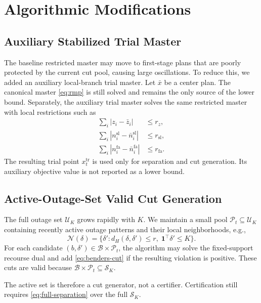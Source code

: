 \documentclass[11pt]{article}
\newcommand{\Bset}{\mathcal B}
\newcommand{\Sset}{\mathcal S}
\newcommand{\Uset}{\mathcal U}
\begin{document}
\section{Algorithmic Modifications}

\subsection{Auxiliary Stabilized Trial Master}

The baseline restricted master may move to first-stage plans that are poorly
protected by the current cut pool, causing large oscillations.  To reduce this,
we added an auxiliary local-branch trial master.  Let $\bar x$ be a center plan.
The canonical master \eqref{eq:rmp} is still solved and remains the only source
of the lower bound.  Separately, the auxiliary trial master solves the same
restricted master with local restrictions such as
\begin{align}
    \sum_i |z_i-\bar z_i| &\le r_z, \label{eq:z-trust}\\
    \sum_i |n^{\mathrm{sl}}_i-\bar n^{\mathrm{sl}}_i| &\le r_{\mathrm{sl}},
    \label{eq:sl-trust}\\
    \sum_i |n^{\mathrm{fa}}_i-\bar n^{\mathrm{fa}}_i| &\le r_{\mathrm{fa}}.
    \label{eq:fa-trust}
\end{align}
The resulting trial point $x_t^{\mathrm{tr}}$ is used only for separation and
cut generation.  Its auxiliary objective value is not reported as a lower
bound.

\subsection{Active-Outage-Set Valid Cut Generation}

The full outage set $\Uset_K$ grows rapidly with $K$.  We maintain a small pool
$\mathcal P_t\subseteq \Uset_K$ containing recently active outage patterns and
their local neighborhoods, e.g.,
\[
    \mathcal N(\delta)
    =
    \{\delta': d_H(\delta,\delta')\le r,\;
    \mathbf 1^\top \delta'\le K\}.
\]
For each candidate $(b,\delta')\in\Bset\times\mathcal P_t$, the algorithm may
solve the fixed-support recourse dual and add \eqref{eq:benders-cut} if the
resulting violation is positive.  These cuts are valid because
$\Bset\times\mathcal P_t\subseteq\Sset_K$.

The active set is therefore a cut generator, not a certifier.  Certification
still requires \eqref{eq:full-separation} over the full $\Sset_K$.
\end{document}
